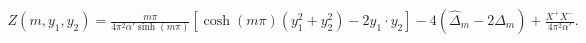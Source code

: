 \begin{equation}
\begin{split}
  Z(m,y_1,y_2) = %
\frac{m\pi}{4\pi^2\alpha'\sinh(m\pi)}
         \left[ \cosh(m\pi)(y_1^2+y_2^2)-2y_1\cdot y_2\right] 
    - 4(\hat{\Delta}_m-2\Delta_m)
    +\frac{X^+X^-}{4\pi^2\alpha'}.
\end{split}
\end{equation} 
